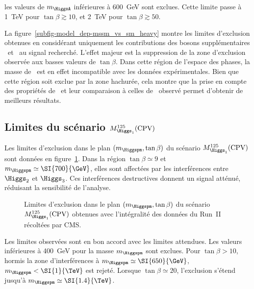 les valeurs de $m_{\HiggsA}$ inférieures à \SI{600}{\GeV} sont exclues.
Cette limite passe à \SI{1}{\TeV} pour $\tan\beta\gtrsim\num{10}$,
et \SI{2}{\TeV} pour $\tan\beta\gtrsim\num{50}$.
\par
La figure~\ref{subfig-model_dep-mssm_vs_sm_heavy} montre les limites d'exclusion obtenues
en considérant uniquement les contributions des bosons supplémentaires \Higgs\ et \HiggsA\ au signal recherché.
L'effet majeur est la suppression de la zone d'exclusion observée aux basses valeurs de $\tan\beta$.
Dans cette région de l'espace des phases, la masse de \higgsMSSM\ est en effet incompatible avec les données expérimentales.
Bien que cette région soit exclue par la zone hachurée,
cela montre que la prise en compte des propriétés de \higgsMSSM\
et leur comparaison à celles de \higgs\ observé permet d'obtenir de meilleurs résultats.
\subsection[Limites du scénario $M_{\Higgs_1}^{125}$ avec violation de $CP$]{Limites du scénario $M_{\Higgs_1}^{125}(\text{CPV})$}
Les limites d'exclusion dans le plan $(m_{\Higgspm},\tan\beta)$ du scénario $M_{\Higgs_1}^{125}(\text{CPV})$
sont données en figure~\ref{fig-model_dep-CPV}.
Dans la région $\tan\beta\simeq\num{9}$ et $m_{\Higgspm}\simeq\SI{700}{\GeV}$,
elles sont affectées par les interférences entre $\Higgs_2$ et $\Higgs_3$.
Ces interférences destructives donnent un signal atténué, réduisant la sensibilité de l'analyse.
\begin{figure}[h]
\centering


\caption[Limites d'exclusion du scénario $M_{\Higgs_1}^{125}(\text{CPV})$.]{Limites d'exclusion dans le plan $(m_{\Higgspm},\tan\beta)$ du scénario $M_{\Higgs_1}^{125}(\text{CPV})$ obtenues avec l'intégralité des données du Run~II récoltées par CMS.}
\label{fig-model_dep-CPV}
\end{figure}
\par
Les limites observées sont en bon accord avec les limites attendues.
Les valeurs inférieures à \SI{400}{\GeV} pour la masse $m_{\Higgspm}$ sont exclues.
Pour $\tan\beta>\num{10}$,
hormis la zone d'interférences à $m_{\Higgspm} \simeq \SI{650}{\GeV}$,
$m_{\Higgspm} < \SI{1}{\TeV}$ est rejeté.
Lorsque
$\tan\beta\simeq\num{20}$,
l'exclusion s'étend jusqu'à
$m_{\Higgspm} \simeq \SI{1.4}{\TeV}$.

